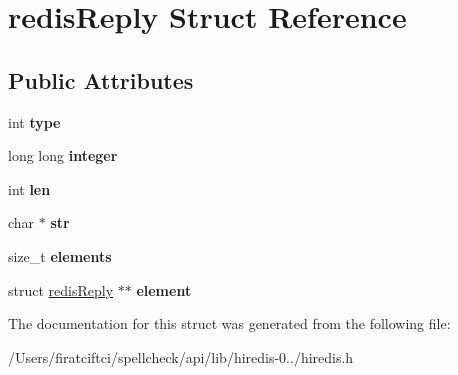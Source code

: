 \hypertarget{structredis_reply}{}\section{redis\+Reply Struct Reference}
\label{structredis_reply}
\subsection*{Public Attributes}
\begin{DoxyCompactItemize}
\item 
\mbox{\label{structredis_reply_ae0f63252174a354d1c2d6166ca1561a7}} 
int {\bfseries type}
\item 
\mbox{\label{structredis_reply_afeea337ee0f85106d6b5bc78d1ed7e0a}} 
long long {\bfseries integer}
\item 
\mbox{\label{structredis_reply_aee07b9671e698a7f36d4ef72d27ca47e}} 
int {\bfseries len}
\item 
\mbox{\label{structredis_reply_a3f90c90562204a5a44bde464c12c7d44}} 
char $\ast$ {\bfseries str}
\item 
\mbox{\label{structredis_reply_a5d119457290bdb62236b59480a45a7b7}} 
size\+\_\+t {\bfseries elements}
\item 
\mbox{\label{structredis_reply_abeda65603c39ad7aeeae9c647dd99d1e}} 
struct \mbox{\hyperlink{structredis_reply}{redis\+Reply}} $\ast$$\ast$ {\bfseries element}
\end{DoxyCompactItemize}


The documentation for this struct was generated from the following file\+:\begin{DoxyCompactItemize}
\item 
/\+Users/firatciftci/spellcheck/api/lib/hiredis-\/0../hiredis.\+h\end{DoxyCompactItemize}
